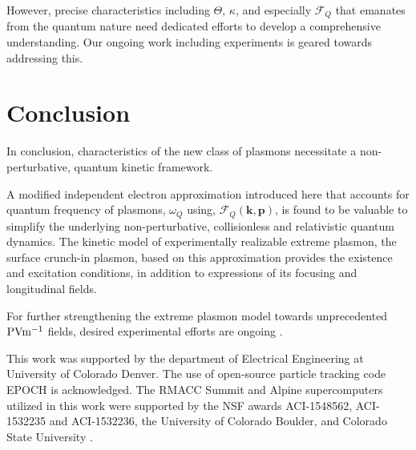 \documentclass[aps,twocolumn,notitlepage,superscriptaddress]{revtex4-1}
\renewcommand\vec{\mathbf}
\begin{document}
However, precise characteristics including $\Theta$, $\kappa$, and especially $\mathscr{F}_Q$ that emanates from the quantum nature need dedicated efforts to develop a comprehensive understanding. Our ongoing work including experiments \cite{slac-2023,slac-2022,slac-2020} is geared towards addressing this.

\section{Conclusion}

In conclusion, characteristics of the new class of plasmons necessitate a non-perturbative, quantum kinetic framework. 

A modified independent electron approximation introduced here that accounts for quantum frequency of plasmons, $\omega_Q$ using, $\mathscr{F}_Q(\vec{k},\vec{p})$, is found to be valuable to simplify the underlying non-perturbative, collisionless and relativistic quantum dynamics. The kinetic model of experimentally realizable extreme plasmon, the surface crunch-in plasmon, based on this approximation provides the existence and excitation conditions, in addition to expressions of its focusing and longitudinal fields.

For further strengthening the extreme plasmon model towards unprecedented $\rm PVm^{-1}$ fields, desired experimental efforts are ongoing \cite{slac-2023,slac-2022,slac-2020}.

\acknowledgments
This work was supported by the department of Electrical Engineering at University of Colorado Denver. The use of open-source particle tracking code EPOCH \cite{epoch-pic} is acknowledged. The RMACC Summit and Alpine supercomputers utilized in this work were supported by the NSF awards ACI-1548562, ACI-1532235 and ACI-1532236, the University of Colorado Boulder, and Colorado State University \cite{xsede-rmacc-citation}.
\end{document}
